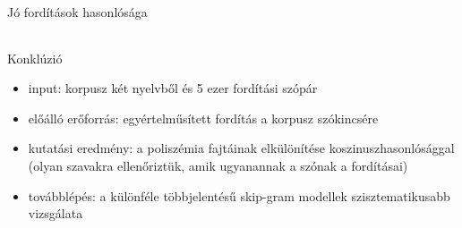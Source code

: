 \documentclass{beamer}
\newcommand{\fl}{\texttt{4lang}}
\begin{document}
\begin{frame}[allowframebreaks]{Jó fordítások hasonlósága}
\begin{longtable}{lllll}
    \bottomrule
  \end{longtable}
\end{frame} 
\begin{frame}{Konklúzió}
  \begin{itemize}
    \item input: korpusz két nyelvből és 5 ezer fordítási szópár
    \item előálló erőforrás: egyértelműsített fordítás a korpusz szókincsére
    \item kutatási eredmény: a poliszémia fajtáinak elkülönítése
      koszinuszhasonlósággal (olyan szavakra ellenőriztük, amik ugyanannak a
      szónak a fordításai)
    \item továbblépés: a különféle többjelentésű skip-gram modellek
      szisztematikusabb vizsgálata
  \end{itemize}
\end{frame} 
\end{document}
